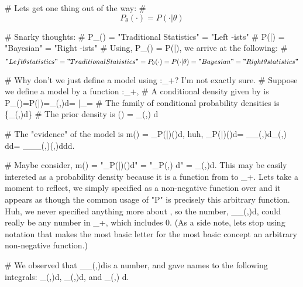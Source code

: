 # Lets get one thing out of the way:
# \[ P_\theta(\cdot) = P(\cdot|\theta) \]

# Snarky thoughts:
# P_\theta(\cdot) = "Traditional Statistics" = "Left \theta-ists"
# P(\cdot|\theta) = "Bayesian" = "Right \theta-ists" 
# Using, P_\theta(\cdot) = P(\cdot|\theta), we arrive at the following:
# \[ "Left \theta statistics" = "Traditional Statistics" = P_\theta(\cdot) = P(\cdot|\theta) = "Bayesian" = "Right \theta statistics" \]

# Why don't we just define a model using :\Omega\times\Theta\to{}_+? I'm not exactly sure.
# Suppose we define a model by a function :\Omega\times\Theta\to{}_+,
# A conditional density given by \theta is P_\theta(\cdot)=P(\cdot|\theta)=\int_\Omega {}(\cdot,\theta)d\omega = |_{\vartheta=\theta}
# The family of conditional probability densities is \{\int_\Omega {}(\cdot,\theta)d\omega \mid \theta\in\Theta\}
# The prior density is \pi(\cdot) = \int_\Omega {}(\omega,\cdot) d\omega

# The "evidence" of the model is m(\cdot) = \int_\Theta P(\cdot|\theta)\pi(\theta)d\theta, huh, \int_\Theta P(\cdot|\theta)\pi(\theta)d\theta = \int_\Theta \int_\Omega {}(\cdot,\theta)d\omega \int_\Omega {}(\omega,\theta) d\omega d\theta = \int_\Theta \int_\Omega \int_\Omega {}(\cdot,\theta)(\omega,\theta)d\omega d\omega d\theta.

# Maybe consider, m(\cdot) = "\int_\Theta P(\cdot|\theta)\pi(\theta)d\theta" = "\int_\Theta P(\cdot,\theta) d\theta" = \int_\Theta{}(\cdot,\theta)d\theta. This may be easily intereted as a probability density because it is a function from \Omega to _+. Lets take a moment to reflect, we simply specified  as a non-negative function over \Omega\times\Theta and it appears as though the common usage of "P" is precisely this arbitrary function. Huh, we never specified anything more about , so the number, \int_\Omega\int_\Theta {}(\omega,\theta)d\omegad\theta, could really be any number in _+, which includes 0. (As a side note, lets stop using notation that makes the most basic letter for the most basic concept an arbitrary non-negative function.)

# We observed that \int_\Omega\int_\Theta {}(\omega,\theta)d\omegad\theta is a number, and gave names to the following integrals: \int_\Omega {}(\cdot,\theta)d\omega, \int_\Omega {}(\omega,\cdot)d\omega, and \int_\Theta {}(\cdot,\theta) d\theta.

